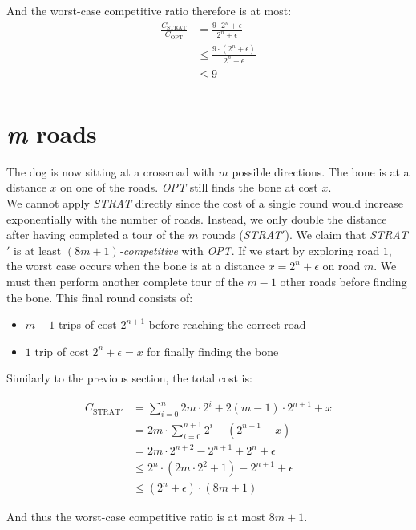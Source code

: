 And the worst-case competitive ratio therefore is at most:
\[
\begin{array}{ll}
  \frac{C_\text{STRAT}}{C_\text{OPT}}
    & = \frac{9 \cdot 2^n + \epsilon}{2^n + \epsilon}\\
    & \leq \frac{9 \cdot (2^n + \epsilon)}{2^n + \epsilon}\\
    & \leq 9\\
\end{array}
\]


\section{\textit{m} roads}

The dog is now sitting at a crossroad with $m$ possible directions. The bone is at a distance $x$ on one of the roads. \textit{OPT} still finds the bone at cost $x$.\\

We cannot apply \textit{STRAT} directly since the cost of a single round would increase exponentially with the number of roads. Instead, we only double the distance after having completed a tour of the $m$ rounds (\textit{STRAT$\prime$}). We claim that \textit{STRAT$\prime$} is at least \textit{$(8m + 1)$-competitive} with \textit{OPT}. If we start by exploring road $1$, the worst case occurs when the bone is at a distance $x = 2^n + \epsilon$ on road $m$. We must then perform another complete tour of the $m-1$ other roads before finding the bone. This final round consists of:
\begin{itemize}
  \item $m-1$ trips of cost $2^{n+1}$ before reaching the correct road
  \item $1$ trip of cost $2^n + \epsilon = x$ for finally finding the bone
\end{itemize}

Similarly to the previous section, the total cost is:

\[
\begin{array}{ll}
  C_{\text{STRAT}\prime}
    & = \sum_{i=0}^n {2m \cdot 2^i} + 2(m-1) \cdot 2^{n+1} + x \\
    & = 2m \cdot \sum_{i=0}^{n+1} {2^i} - (2^{n+1} - x) \\
    & = 2m \cdot 2^{n+2} - 2^{n+1} + 2^n + \epsilon \\
    & \leq 2^n \cdot (2m \cdot 2^2 + 1) - 2^{n+1} + \epsilon \\
    & \leq (2^n + \epsilon) \cdot (8m + 1)
\end{array}
\]

And thus the worst-case competitive ratio is at most $8m + 1$.

